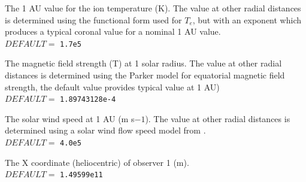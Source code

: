 \documentclass[12pt,a4paper]{article}
\begin{document}
  \vspace{0.5cm}

  \setlength{\temptextwidth}{\textwidth}  
  \addtolength{\temptextwidth}{-1.0\parindent} 
  
    \parbox[t]{\temptextwidth}{The 1 AU value for the ion temperature (K). The 
                               value at other radial distances is determined 
                               using the functional form used for $T_e$, but 
                               with an exponent which produces a typical coronal 
                               value for a nominal 1 AU value. \\ 
                               $DEFAULT=$ {\tt 1.7e5}}

  \vspace{0.5cm}

  \setlength{\temptextwidth}{\textwidth}  
  \addtolength{\temptextwidth}{-1.0\parindent} 
    \parbox[t]{\temptextwidth}{The magnetic field strength (T) at 1 solar radius. 
                               The  value at other radial
                               distances is determined  using the Parker
                               model for equatorial magnetic field
                               strength, the default value provides typical 
                               value at 1 AU) \\ 
                               $DEFAULT=$ {\tt 1.89743128e-4}}

  \vspace{0.5cm}

  \setlength{\temptextwidth}{\textwidth}  
  \addtolength{\temptextwidth}{-1.0\parindent} 
  
    \parbox[t]{\temptextwidth}{The solar wind speed at 1 AU (m s${-1}$). The value at
                               other radial distances  is determined
                               using a solar wind flow speed model from  
                               \citet{rc98c}.\\ 
                               $DEFAULT=$ {\tt 4.0e5}}

  \vspace{0.5cm}

  \setlength{\temptextwidth}{\textwidth}  
  \addtolength{\temptextwidth}{-1.0\parindent} 
  
    \parbox[t]{\temptextwidth}{The X coordinate (heliocentric) of observer 1 (m). \\ 
                               $DEFAULT=$ {\tt 1.49599e11}}
\end{document}
